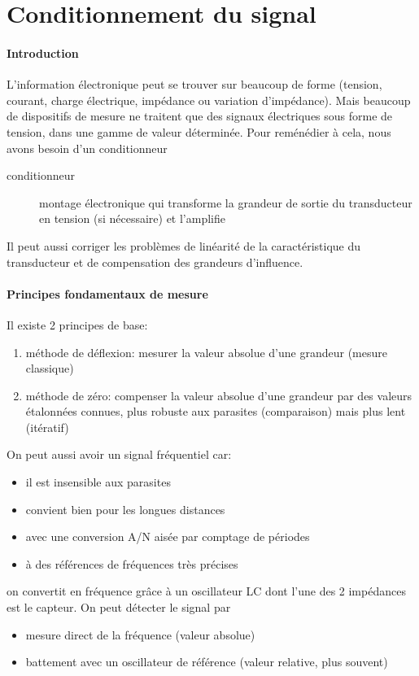 \chapter{Conditionnement du signal}
\subsubsection{Introduction}
L'information électronique peut se trouver sur beaucoup de forme (tension, courant, charge électrique, impédance ou variation d'impédance). Mais beaucoup de dispositifs de mesure ne traitent que des signaux électriques sous forme de tension, dans une gamme de valeur déterminée. Pour reménédier à cela, nous avons besoin d'un conditionneur
\begin{description}
	\item[conditionneur] montage électronique qui transforme la grandeur de sortie du transducteur en tension (si nécessaire) et l'amplifie
\end{description}
Il peut aussi corriger les problèmes de linéarité de la caractéristique du transducteur et de compensation des grandeurs d'influence.
\subsubsection{Principes fondamentaux de mesure}
Il existe 2 principes de base:
\begin{enumerate}
	\item méthode de déflexion: mesurer la valeur absolue d'une grandeur (mesure classique)
	\item méthode de zéro: compenser la valeur absolue d'une grandeur par des valeurs étalonnées connues, plus robuste aux parasites (comparaison) mais plus lent (itératif)
\end{enumerate}
On peut aussi avoir un signal fréquentiel car:
\begin{itemize}
	\item il est insensible aux parasites
	\item convient bien pour les longues distances
	\item avec une conversion A/N aisée par comptage de périodes
	\item à des références de fréquences très précises
\end{itemize}
on convertit en fréquence grâce à un oscillateur LC dont l'une des 2 impédances est le capteur. On peut détecter le signal par
\begin{itemize}
	\item mesure direct de la fréquence (valeur absolue)
	\item battement avec un oscillateur de référence (valeur relative, plus souvent)
\end{itemize}

